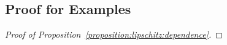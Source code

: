 \documentclass[11pt,a4paper]{article}
\theoremstyle{remark}
\theoremstyle{definition}
\theoremstyle{definition}
\begin{document}
\begin{bibunit}[apalike]





\appendix


\section{Proof for Examples}
\label{subsec:proofs-for-example}

\begin{proof}[Proof of Proposition~\ref{proposition:lipschitz:dependence}]


\end{proof}
\end{bibunit}
\end{document}
